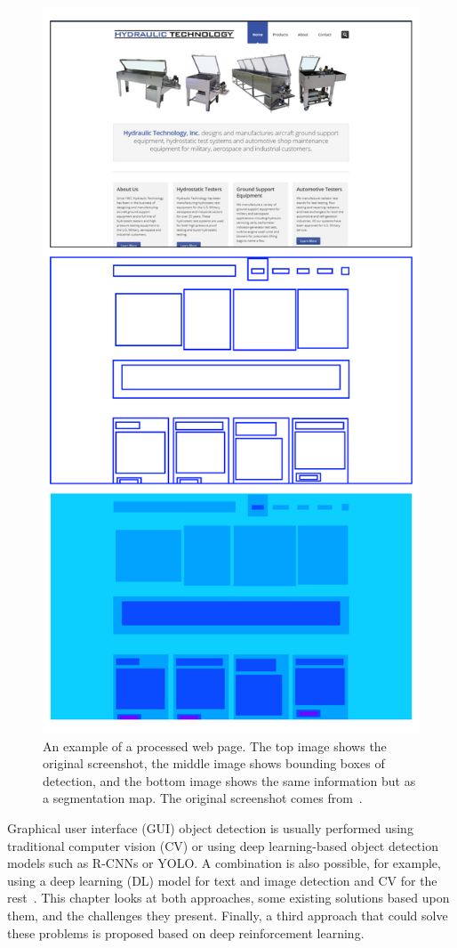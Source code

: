 \documentclass[
  digital,     %
  oneside,     %
  nosansbold,  %
  nocolorbold, %
  lof,         %
  lot,         %
]{fithesis4}
\begin{document}
\begin{figure}
    \centering
    \includegraphics[width=0.7\linewidth]{diagrams/result_example.pdf}
    \caption{An example of a processed web page. The top image shows the original screenshot, the middle image shows bounding boxes of detection, and the bottom image shows the same information but as a segmentation map. The original screenshot comes from~\cite{aydos2020}.}
    \label{fig:example-result}
\end{figure}

Graphical user interface (GUI) object detection is usually performed using traditional computer vision (CV) or using deep learning-based object detection models such as R-CNNs or YOLO. A combination is also possible, for example, using a deep learning (DL) model for text and image detection and CV for the rest~\cite{ODforGUI_CV_DL_or_both}. This chapter looks at both approaches, some existing solutions based upon them, and the challenges they present. Finally, a third approach that could solve these problems is proposed based on deep reinforcement learning.
\end{document}
